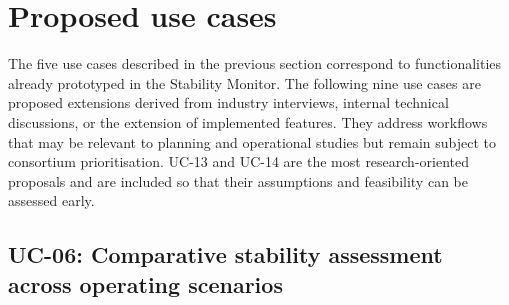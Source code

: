 \section{Proposed use cases}

The five use cases described in the previous section correspond to functionalities already prototyped in the Stability Monitor. The following nine use cases are proposed extensions derived from industry interviews, internal technical discussions, or the extension of implemented features. They address workflows that may be relevant to planning and operational studies but remain subject to consortium prioritisation. UC-13 and UC-14 are the most research-oriented proposals and are included so that their assumptions and feasibility can be assessed early.

\subsection{UC-06: Comparative stability assessment across operating scenarios}



